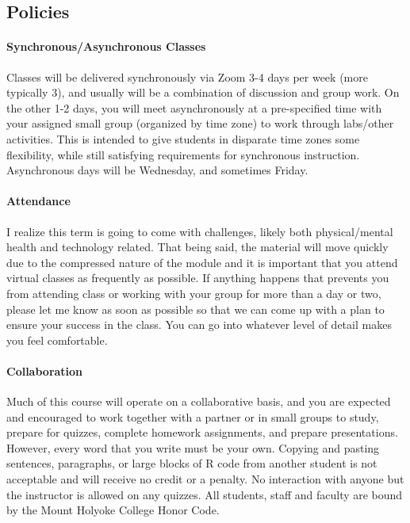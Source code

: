 \documentclass[11pt]{article}
\begin{document}
\subsection*{Policies}

\paragraph{Synchronous/Asynchronous Classes}
Classes will be delivered synchronously via Zoom 3-4 days per week (more typically 3), and usually will be a combination of discussion and group work. On the other 1-2 days, you will meet asynchronously at a pre-specified time with your assigned small group (organized by time zone) to work through labs/other activities. This is intended to give students in disparate time zones some flexibility, while still satisfying requirements for synchronous instruction. Asynchronous days will be Wednesday, and sometimes Friday.

\paragraph{Attendance}
I realize this term is going to come with challenges, likely both physical/mental health and technology related. That being said, the material will move quickly due to the compressed nature of the module and it is important that you attend virtual classes as frequently as possible. If anything happens that prevents you from attending class or working with your group for more than a day or two, please let me know as soon as possible so that we can come up with a plan to ensure your success in the class. You can go into whatever level of detail makes you feel comfortable.

\paragraph{Collaboration}
Much of this course will operate on a collaborative basis, and you are expected and encouraged to work together with a partner or in small groups to study, prepare for quizzes, complete homework assignments, and prepare presentations. However, every word that you write must be your own. Copying and pasting sentences, paragraphs, or large blocks of R code from another student is not acceptable and will receive no credit or a penalty. No interaction with 
anyone but the instructor is allowed on any quizzes.  All students, staff and faculty are bound by the Mount Holyoke College Honor Code.
\end{document}
